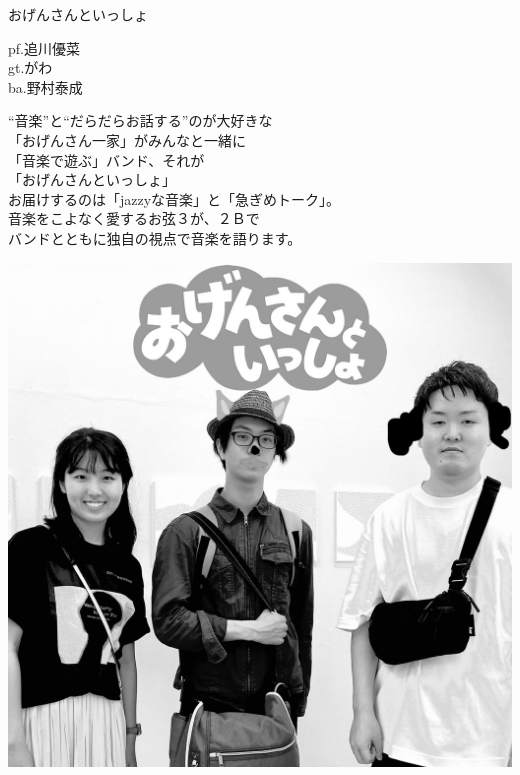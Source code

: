 \documentclass[a4paper]{article}
\begin{document}
\begin{minipage}{\textwidth - 0.25\textheight}
    \flushleft
    \Huge \vspace{1em}おげんさんといっしょ\vspace{1em}\normalsize \\
    \begin{minipage}{11em}
        \flushleft
        \Large
        pf.追川優菜\\gt.がわ\\ba.野村泰成
    \end{minipage}
    \begin{minipage}{\textwidth - 18em}
        \flushleft
        \large
        “音楽”と“だらだらお話する”のが大好きな\\
        「おげんさん一家」がみんなと一緒に\\
        「音楽で遊ぶ」バンド、それが\\
        「おげんさんといっしょ」\\
        お届けするのは「jazzyな音楽」と「急ぎめトーク」。\\
        音楽をこよなく愛するお弦３が、２Ｂで\\
        バンドとともに独自の視点で音楽を語ります。
    \end{minipage}
\end{minipage}
\begin{minipage}{0.25\textheight}
    \flushleft
    \includegraphics[width=0.25\textheight]{./FULLHOUSE/resources/5.jpeg}
\end{minipage}
\end{document}
